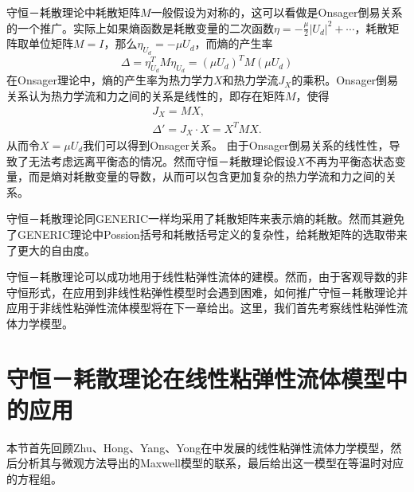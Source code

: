 	守恒－耗散理论中耗散矩阵$M$一般假设为对称的，这可以看做是Onsager倒易关系的一个推广。实际上如果熵函数是耗散变量的二次函数$\eta = -\frac{\mu}{2} |U_d|^2 + \cdots$，耗散矩阵取单位矩阵$M=I$，那么$\eta_{U_d} = - \mu U_d$，而熵的产生率
	\begin{equation*}
		\Delta = \eta_{U_d}^T M \eta_{U_d} = (\mu U_d)^T M (\mu U_d)%
	\end{equation*}
	在Onsager理论中，熵的产生率为热力学力$X$和热力学流$J_X$的乘积。Onsager倒易关系认为热力学流和力之间的关系是线性的，即存在矩阵$M$，使得
	\begin{eqnarray*}
		J_X = M X ,\\
		\Delta'= J_X \cdot X = X^T M X.
	\end{eqnarray*}
	从而令$X=\mu U_d$我们可以得到Onsager关系。
	由于Onsager倒易关系的线性性，导致了无法考虑远离平衡态的情况。然而守恒－耗散理论假设$X$不再为平衡态状态变量，而是熵对耗散变量的导数，从而可以包含更加复杂的热力学流和力之间的关系。

	守恒－耗散理论同GENERIC一样均采用了耗散矩阵来表示熵的耗散。然而其避免了GENERIC理论中Possion括号和耗散括号定义的复杂性，给耗散矩阵的选取带来了更大的自由度。%

	守恒－耗散理论可以成功地用于线性粘弹性流体的建模。然而，由于客观导数的非守恒形式，在应用到非线性粘弹性模型时会遇到困难，如何推广守恒－耗散理论并应用于非线性粘弹性流体模型将在下一章给出。这里，我们首先考察线性粘弹性流体力学模型。

	\section{守恒－耗散理论在线性粘弹性流体模型中的应用}
	本节首先回顾Zhu、Hong、Yang、Yong在\cite{zhu2014conservation}中发展的线性粘弹性流体力学模型，然后分析其与微观方法导出的Maxwell模型的联系，最后给出这一模型在等温时对应的方程组。
